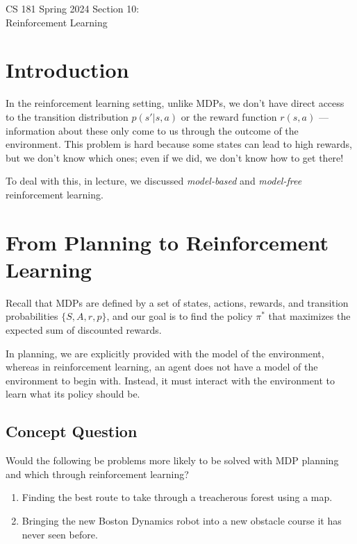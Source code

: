 \documentclass[11pt, letterpaper]{article}
\begin{document}
\begin{center}
    {\LARGE CS 181 Spring 2024 Section 10:\\
        {\Large Reinforcement Learning }}
\end{center}

\section{Introduction}

In the reinforcement learning setting, unlike MDPs, we don't have direct access to the transition distribution $p(s'|s,a)$ or the reward function $r(s,a)$ --- information about these only come to us through the outcome of the environment. 
This problem is hard because some states can lead to high rewards, but we don't know which ones; even if we did, we don't know how to get there!

To deal with this, in lecture, we discussed \textit{model-based} and \textit{model-free} reinforcement learning. 


\section{From Planning to Reinforcement Learning}

Recall that MDPs are defined by a set of states, actions, rewards, and
transition probabilities $\{S, A, r, p\}$, and our goal is to find the
policy $\pi^\ast$ that maximizes the expected sum of discounted rewards.

In planning, we are explicitly provided with  the model of the environment, whereas in reinforcement learning, an agent does not have a model of the environment to begin with. Instead, it must interact with the environment to learn what its policy should be. 

\subsection{Concept Question}

Would the following be problems more likely to be solved with MDP planning
and which through  reinforcement learning?
%
\begin{enumerate}
    \item Finding the best route to take through a treacherous forest using a map. 
    
    \item Bringing the new Boston Dynamics robot into a new obstacle course it has never seen before. 
\end{enumerate}
\end{document}
